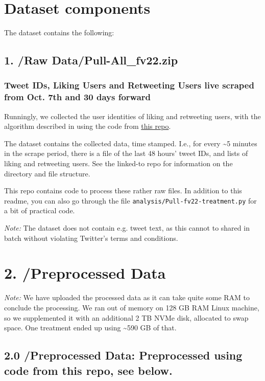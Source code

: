 \documentclass[10pt,english,sigconf,authoryear,nonacm]{article}
\begin{document}
\section*{Dataset components}

The dataset contains the following:

\subsection*{1. /Raw Data/Pull-All\_fv22.zip}

\subsubsection*{Tweet IDs, Liking Users and Retweeting Users live scraped from Oct.
7th and 30 days forward}

Runningly, we collected the user identities of liking and retweeting
users, with the algorithm described in \cite{JahnRendsvigTwitterLikesCIB}
using the code from \href{https://github.com/humanplayer2/get-twitter-likers-data}{this repo}.

The dataset contains the collected data, time stamped. I.e., for every
\textasciitilde 5 minutes in the scrape period, there is a file of
the last 48 hours' tweet IDs, and lists of liking and retweeting users.
See the linked-to repo for information on the directory and file structure.

This repo contains code to process these rather raw files. In addition
to this readme, you can also go through the file \texttt{analysis/Pull-fv22-treatment.py}
for a bit of practical code.\medskip{}

\emph{Note:} The dataset does not contain e.g. tweet text, as this
cannot to shared in batch without violating Twitter's terms and conditions.

\section*{2. /Preprocessed Data}

\emph{Note:} We have uploaded the processed data as it can take quite
some RAM to conclude the processing. We ran out of memory on 128 GB
RAM Linux machine, so we supplemented it with an additional 2 TB NVMe
disk, allocated to swap space. One treatment ended up using \textasciitilde 590
GB of that.

\subsection*{2.0 /Preprocessed Data: Preprocessed using code from this repo, see
below.}
\end{document}
